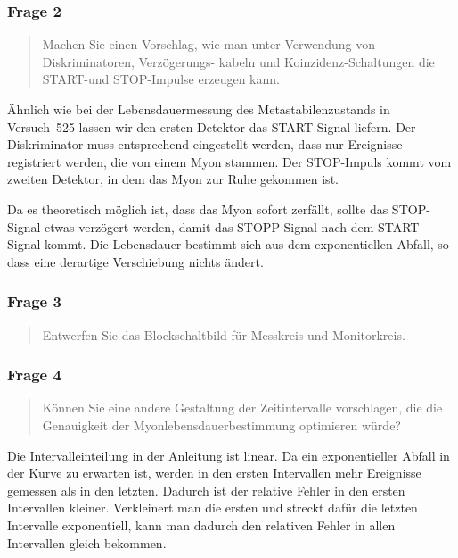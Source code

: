 \documentclass[11pt, ngerman, fleqn, DIV=15, headinclude, BCOR=2cm]{scrreprt}
\begin{document}
\parencite[115]{Grupen/Astroteilchenphysik}


\subsubsection{Frage 2}

\begin{quote}
    Machen Sie einen Vorschlag, wie man unter Verwendung von Diskriminatoren,
    Verzögerungs- kabeln und Koinzidenz-Schaltungen die START-und STOP-Impulse
    erzeugen kann.
\end{quote}

Ähnlich wie bei der Lebensdauermessung des Metastabilenzustands in Versuch~525
lassen wir den ersten Detektor das START-Signal liefern. Der Diskriminator muss
entsprechend eingestellt werden, dass nur Ereignisse registriert werden, die
von einem Myon stammen. Der STOP-Impuls kommt vom zweiten Detektor, in dem das
Myon zur Ruhe gekommen ist.

Da es theoretisch möglich ist, dass das Myon sofort zerfällt, sollte das
STOP-Signal etwas verzögert werden, damit das STOPP-Signal nach dem
START-Signal kommt. Die Lebensdauer bestimmt sich aus dem exponentiellen
Abfall, so dass eine derartige Verschiebung nichts ändert.

\subsubsection{Frage 3}

\begin{quote}
    Entwerfen Sie das Blockschaltbild für Messkreis und Monitorkreis.
\end{quote}


\subsubsection{Frage 4}

\begin{quote}
    Können Sie eine andere Gestaltung der Zeitintervalle vorschlagen, die die
    Genauigkeit der Myonlebensdauerbestimmung optimieren würde?
\end{quote}

Die Intervalleinteilung in der Anleitung ist linear. Da ein exponentieller
Abfall in der Kurve zu erwarten ist, werden in den ersten Intervallen mehr
Ereignisse gemessen als in den letzten. Dadurch ist der relative Fehler in den
ersten Intervallen kleiner. Verkleinert man die ersten und streckt dafür die
letzten Intervalle exponentiell, kann man dadurch den relativen Fehler in allen
Intervallen gleich bekommen.
\end{document}
